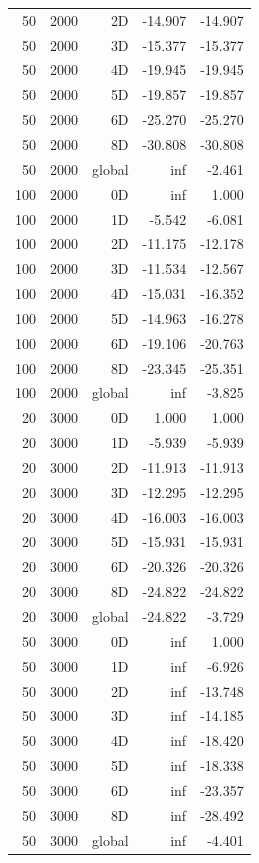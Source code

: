 \begin{longtable}{rrrrr}
50 & 2000 & 2D & -14.907 & -14.907 \\
50 & 2000 & 3D & -15.377 & -15.377 \\
50 & 2000 & 4D & -19.945 & -19.945 \\
50 & 2000 & 5D & -19.857 & -19.857 \\
50 & 2000 & 6D & -25.270 & -25.270 \\
50 & 2000 & 8D & -30.808 & -30.808 \\
50 & 2000 & global & inf & -2.461 \\
100 & 2000 & 0D & inf & 1.000 \\
100 & 2000 & 1D & -5.542 & -6.081 \\
100 & 2000 & 2D & -11.175 & -12.178 \\
100 & 2000 & 3D & -11.534 & -12.567 \\
100 & 2000 & 4D & -15.031 & -16.352 \\
100 & 2000 & 5D & -14.963 & -16.278 \\
100 & 2000 & 6D & -19.106 & -20.763 \\
100 & 2000 & 8D & -23.345 & -25.351 \\
100 & 2000 & global & inf & -3.825 \\
20 & 3000 & 0D & 1.000 & 1.000 \\
20 & 3000 & 1D & -5.939 & -5.939 \\
20 & 3000 & 2D & -11.913 & -11.913 \\
20 & 3000 & 3D & -12.295 & -12.295 \\
20 & 3000 & 4D & -16.003 & -16.003 \\
20 & 3000 & 5D & -15.931 & -15.931 \\
20 & 3000 & 6D & -20.326 & -20.326 \\
20 & 3000 & 8D & -24.822 & -24.822 \\
20 & 3000 & global & -24.822 & -3.729 \\
50 & 3000 & 0D & inf & 1.000 \\
50 & 3000 & 1D & inf & -6.926 \\
50 & 3000 & 2D & inf & -13.748 \\
50 & 3000 & 3D & inf & -14.185 \\
50 & 3000 & 4D & inf & -18.420 \\
50 & 3000 & 5D & inf & -18.338 \\
50 & 3000 & 6D & inf & -23.357 \\
50 & 3000 & 8D & inf & -28.492 \\
50 & 3000 & global & inf & -4.401 \\

\end{longtable}
